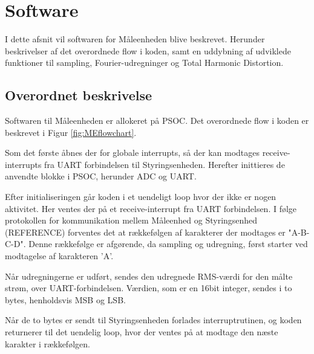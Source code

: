 
\section{Software}

I dette afsnit vil softwaren for Måleenheden blive beskrevet. Herunder beskrivelser af det overordnede flow i koden, samt en uddybning af udviklede funktioner til sampling, Fourier-udregninger og Total Harmonic Distortion. 

\subsection{Overordnet beskrivelse}

Softwaren til Måleenheden er allokeret på PSOC. Det overordnede flow i koden er beskrevet i Figur \ref{fig:MEflowchart}. 

Som det første åbnes der for globale interrupts, så der kan modtages receive-interrupts fra UART forbindelsen til Styringsenheden. Herefter inittieres de anvendte blokke i PSOC, herunder ADC og UART. 

Efter initialiseringen går koden i et uendeligt loop hvor der ikke er nogen aktivitet.  Her ventes der på et receive-interrupt fra UART forbindelsen. I følge protokollen for kommunikation mellem Måleenhed og Styringsenhed (REFERENCE) forventes det at rækkefølgen af karakterer der modtages er "A-B-C-D". Denne rækkefølge er afgørende, da sampling og udregning, først starter ved modtagelse af karakteren 'A'. 

Når udregningerne er udført, sendes den udregnede RMS-værdi for den målte strøm, over UART-forbindelsen. Værdien, som er en 16bit integer, sendes i to bytes, henholdsvis MSB og LSB. 

Når de to bytes er sendt til Styringsenheden forlades interruptrutinen, og koden returnerer til det uendelig loop, hvor der ventes på at modtage den næste karakter i rækkefølgen. 

